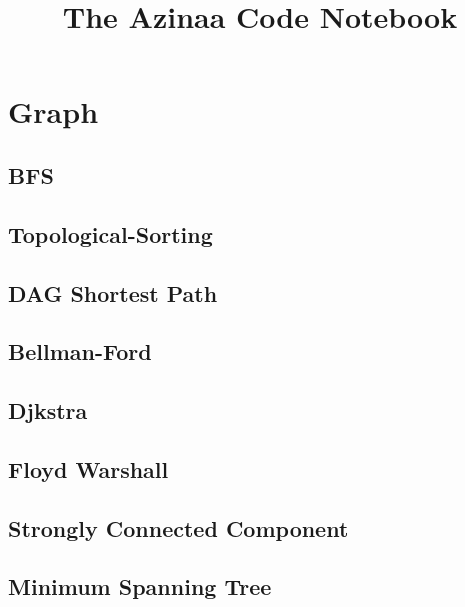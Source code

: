 \documentclass[8pt,twocolumn, landscape, a4paper]{report}
\begin{document}
\begin{titlepage}
\title{The Azinaa Code Notebook}
\maketitle
\end{titlepage}
\newpage
  \tableofcontents
\newpage
\section{Graph}

\subsection{BFS}


\subsection{Topological-Sorting}


\subsection{DAG Shortest Path}


\subsection{Bellman-Ford}


\subsection{Djkstra}


\subsection{Floyd Warshall}


\subsection{Strongly Connected Component}


\subsection{Minimum Spanning Tree}

\end{document}

